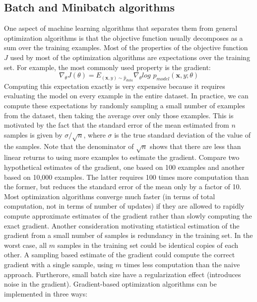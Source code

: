 \subsection{Batch and Minibatch algorithms}
One aspect of machine learning algorithms that separates them from general
optimization algorithms is that the objective function usually decomposes as a sum over the training examples.\newline\newline
Most of the properties of the objective function $J$ used by most of the optimization algorithms are expectations over the training set. For example, the most commonly used property is the gradient:
\[\nabla_\theta J(\theta) = E_{(\textbf{x}, y) \sim \hat{p}_{data}} \nabla_\theta log\,\, p_{model}(\textbf{x}, y; \theta)\]
Computing this expectation exactly is very expensive because it requires
evaluating the model on every example in the entire dataset. In practice, we can compute these expectations by randomly sampling a small number of examples from the dataset, then taking the average over only those examples.\newline\newline
This is motivated by the fact that the standard error of the mean estimated from $n$ samples is given by $\sigma/ \sqrt{n}$, where $\sigma$ is the true standard deviation of the value of the samples. Note that the denominator of $\sqrt{n}$ shows that there are less than linear returns to using more examples to estimate the gradient. Compare two hypothetical
estimates of the gradient, one based on 100 examples and another based on 10,000 examples. The latter requires 100 times more computation than the former, but reduces the standard error of the mean only by a factor of 10.\newline\newline
Most optimization algorithms converge much faster (in terms of total computation, not in terms of number of updates) if they are allowed to rapidly compute approximate estimates of the gradient rather than slowly computing the exact gradient.\newline\newline
Another consideration motivating statistical estimation of the gradient from a small number of samples is redundancy in the training set. In the worst case, all  $m$ samples in the training set could be identical copies of each other. A sampling based estimate of the gradient could compute the correct gradient with a single sample, using $m$ times less computation than the naive approach. Furtherore, small batch size have a regularization effect (introduces noise in the gradient). Gradient-based optimization algorithms can be implemented in three ways:

